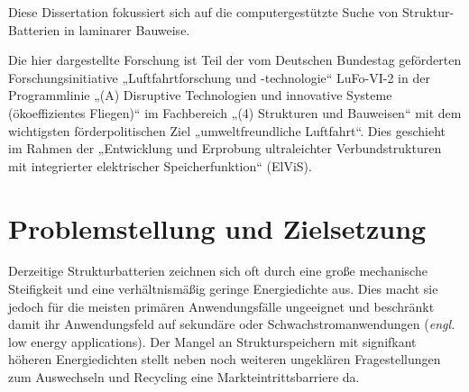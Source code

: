 Diese Dissertation fokussiert sich auf die computergestützte Suche von Struktur-Batterien in laminarer Bauweise.

Die hier dargestellte Forschung ist Teil der vom Deutschen Bundestag geförderten Forschungsinitiative „Luftfahrtforschung und -technologie“ LuFo-VI-2 in der Programmlinie „(A) Disruptive Technologien und innovative Systeme (ökoeffizientes Fliegen)“ im Fachbereich „(4) Strukturen und Bauweisen“ mit dem wichtigsten förderpolitischen Ziel „umweltfreundliche Luftfahrt“. Dies geschieht im Rahmen der „Entwicklung und Erprobung ultraleichter Verbundstrukturen mit integrierter elektrischer Speicherfunktion“ (ElViS).


\section{\label{sec:Motivation_Zielstellung}Problemstellung und Zielsetzung}



Derzeitige Strukturbatterien zeichnen sich oft durch eine große mechanische Steifigkeit und eine verhältnismäßig geringe Energiedichte aus. Dies macht sie jedoch für die meisten primären Anwendungsfälle ungeeignet und beschränkt damit ihr Anwendungsfeld auf sekundäre oder Schwachstromanwendungen (\textit{engl.} low energy applications). Der Mangel an Strukturspeichern mit signifkant höheren Energiedichten stellt neben noch weiteren ungeklären Fragestellungen zum Auswechseln und Recycling eine Markteintrittsbarriere da.

